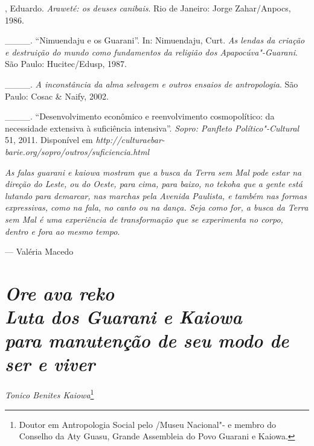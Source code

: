 \begin{Parskip}
, Eduardo. \emph{Araweté: os deuses canibais}. Rio de
Janeiro: Jorge Zahar/Anpocs, 1986.

\_\_\_\_. ``Nimuendaju e os Guarani''. In: Nimuendaju, Curt. \emph{As lendas
da criação e destruição do mundo como fundamentos da religião dos
Apapocúva"-Guarani}. São Paulo: Hucitec/Edusp, 1987.

\_\_\_\_. \emph{A inconstância da alma selvagem e outros ensaios de
antropologia}. São Paulo: Cosac \& Naify, 2002.

\_\_\_\_. ``Desenvolvimento econômico e reenvolvimento cosmopolítico:
da necessidade extensiva à suficiência intensiva''. \emph{Sopro: Panfleto
Político"-Cultural} 51, 2011. Disponível em
\emph{http://culturaebar-
barie.org/sopro/outros/suficiencia.html}
\end{Parskip}

\clearpage

\vspace*{\fill}

\begin{flushright}
\begin{minipage}[c]{0.85\textwidth}
\raggedleft
\footnotesize
\emph{As falas guarani e kaiowa mostram que a busca da Terra sem Mal pode estar na
direção do Leste, ou do Oeste, para cima, para baixo, no \emph{tekoha} que a
gente está lutando para demarcar, nas marchas pela Avenida Paulista, e
também nas formas expressivas, como na fala, no canto ou na dança. Seja
como for, a busca da Terra sem Mal é uma experiência de transformação
que se experimenta no corpo, dentro e fora ao mesmo tempo}.

\smallskip
\hspace*{\fill}--- Valéria Macedo
\end{minipage}
\end{flushright}

\thispagestyle{empty}

\chapter*{\emph{Ore ava reko}\\
\large{\emph{Luta dos Guarani e Kaiowa\\ para
manutenção de seu modo de ser e viver}}}


\begin{flushright}
\emph{Tonico Benites Kaiowa}\footnote{Doutor em Antropologia Social pelo
/Museu Nacional"- e membro do Conselho da Aty Guasu, Grande
Assembleia do Povo Guarani e Kaiowa.}
\end{flushright}
\bigskip

